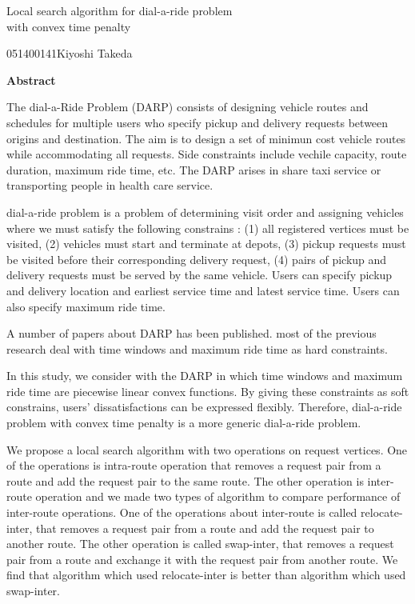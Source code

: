 

\newpage
\begin{center}{\LARGE Local  search algorithm for dial-a-ride problem\\ with convex time penalty}\\[0.5cm]
\end{center}
\hfill {\large 051400141\qquad Kiyoshi Takeda}\\[0.5cm]
\begin{center}
{\large \bf Abstract}\\
\end{center}
The dial-a-Ride Problem (DARP) consists of designing vehicle routes and schedules for multiple users who specify pickup and delivery requests between origins and destination. The aim is to design a set of minimun cost vehicle routes while accommodating all requests. Side constraints include vechile capacity, route duration, maximum ride time, etc. The DARP arises in share taxi service or transporting people in health care service.

dial-a-ride problem is a problem of determining visit order and assigning vehicles where we must satisfy the following constrains : (1) all registered vertices must be visited, (2) vehicles must start and terminate at depots, (3) pickup requests must be visited before their corresponding delivery request, (4) pairs of pickup and delivery requests must be served by the same vehicle.  Users can specify pickup and delivery location and earliest service time and latest service time. Users can also specify maximum ride time.

A number of papers about DARP has been published. most of the previous research deal with time windows and maximum ride time as hard constraints.

In this study, we consider with the DARP in which time windows and maximum ride time are piecewise linear convex functions. By giving these constraints as soft constrains, users' dissatisfactions can be expressed flexibly. Therefore, dial-a-ride problem with convex time penalty is a more generic dial-a-ride problem.

We propose a local search algorithm with two operations on request vertices. One of the operations is intra-route operation that removes a request pair from a route and add the request pair to the same route. The other operation is inter-route operation and we made two types of algorithm to compare performance of inter-route operations.
One of the operations about inter-route is called relocate-inter, that removes a request pair from a route and add the request pair to another route. The other operation is called swap-inter, that removes a request pair from a route and exchange it with the request pair from another route.
We find that algorithm which used relocate-inter is better than algorithm which used swap-inter.

